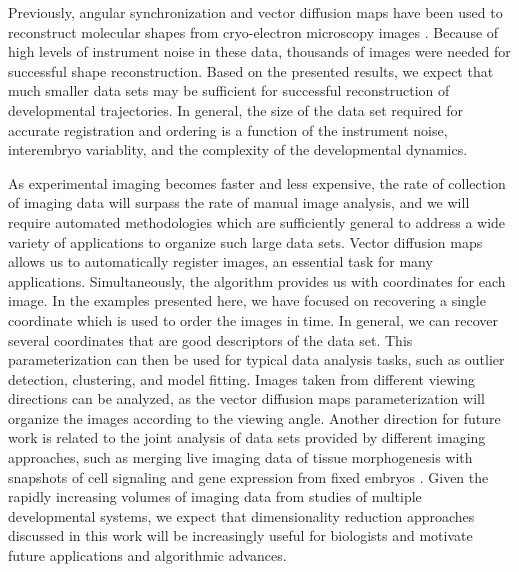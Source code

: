 \documentclass{pnastwo}
\begin{document}
\begin{article}
Previously, angular synchronization and vector diffusion maps have been used to reconstruct molecular shapes from cryo-electron microscopy images \cite{singer2012vector, zhao2014rotationally, singer2011viewing}.
%
Because of high levels of instrument noise in these data, thousands of images were needed for successful shape reconstruction. 
%
Based on the presented results, we expect that much smaller data sets may be sufficient for successful reconstruction of developmental trajectories.
%
In general, the size of the data set required for accurate registration and ordering is a function of the instrument noise, interembryo variablity, and the complexity of the developmental dynamics.
%
 
As experimental imaging becomes faster and less expensive, the rate of collection of imaging data will surpass the rate of manual image analysis,
and we will require automated methodologies which are sufficiently general to address a wide variety of applications to organize such large data sets.
%
Vector diffusion maps allows us to automatically register images, an essential task for many applications.
%
Simultaneously, the algorithm provides us with coordinates for each image.
%
In the examples presented here, we have focused on recovering a single coordinate which is used to order the images in time.
%
In general, we can recover several coordinates that are good descriptors of the data set.
%
This parameterization can then be used for typical data analysis tasks, such as outlier detection, clustering, and model fitting. 
%
Images taken from different viewing directions can be analyzed, as the vector diffusion maps parameterization will organize the images according to the viewing angle.
%
Another direction for future work is related to the joint analysis of data sets provided by different imaging approaches, such as merging live imaging data of tissue morphogenesis with snapshots of cell signaling and gene expression from fixed embryos \cite{krzic2012multiview, ichikawa2014live, rubel2010coupling}.  
%
Given the rapidly increasing volumes of imaging data from studies of multiple developmental systems, we expect that dimensionality reduction approaches discussed in this work will be increasingly useful for biologists and motivate future applications and algorithmic advances. 
  


\end{article}
\end{document}
